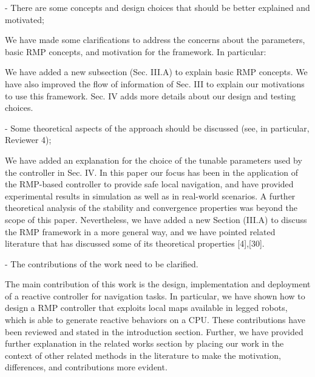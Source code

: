 \documentclass[a4paper,11pt]{article}
\begin{document}
\begin{displayquote}
- There are some concepts and design choices that should be better
explained and motivated;
\end{displayquote}

We have made some clarifications to address the concerns about the parameters, 
basic RMP concepts, and motivation for the framework. In particular:
\begin{outline}[enumerate]
	\1 We have added a new subsection (Sec. III.A) to explain basic RMP 
	concepts.
	\1 We have also improved the flow of information of Sec. III to explain our 
	motivations to use this framework.
	\1 Sec. IV adds more details about our design and testing choices.
\end{outline}

\begin{displayquote}
- Some theoretical aspects of the approach should be discussed (see, in
particular, Reviewer 4);
\end{displayquote}

\begin{outline}[enumerate]
	\1 We have added an explanation for the choice of the tunable parameters 
	used by the controller in Sec. IV.
	\1 In this paper our focus has been in the application of the 
	RMP-based controller to provide safe local navigation, and have provided 
	experimental results in simulation as well as in real-world scenarios. A 
	further theoretical analysis of the stability and convergence properties 
	was beyond the scope of this paper.
	\1 Nevertheless, we have added a new Section (III.A) to discuss the RMP 
	framework in a more general way, and we have pointed related literature 
	that has discussed some of its theoretical properties [4],[30].
\end{outline}

\begin{displayquote}
- The contributions of the work need to be clarified.
\end{displayquote}

\begin{outline}[enumerate]
	\1 The main contribution of this work is the design, implementation and 
	deployment of a reactive controller for navigation tasks.
	\1 In particular, we have shown how to design a RMP controller that 
	exploits local maps available in legged robots, which is able to generate 
	reactive behaviors on a CPU.
	\1 These contributions have been reviewed and stated in the introduction 
	section.
	\1 Further, we have provided further explanation in the related works 
	section by placing our work in the context of other related methods in the 
	literature to make the motivation, differences, and contributions more 
	evident.
\end{outline}
\end{document}
